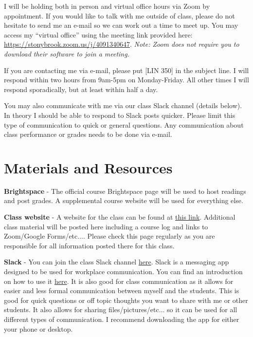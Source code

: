 \documentclass[11pt]{article}
\begin{document}
I will be holding both in person and virtual office hours via Zoom by appointment. 
If you would like to talk with me outside of class, please do not hesitate to send me an e-mail so we can work out a time to meet up. 
You may access my ``virtual office'' using the meeting link provided here: \href{https://stonybrook.zoom.us/j/4091340647}{https://stonybrook.zoom.us/j/4091340647}. 
\textit{Note: Zoom does not require you to download their software to join a meeting.}
\vspace{.25cm}

If you are contacting me via e-mail, please put [LIN 350] in the subject line. I will respond within two hours from 9am-5pm on Monday-Friday. All other times I will respond sporadically, but at least within half a day.  

You may also communicate with me via our class Slack channel (details below). In theory I should be able to respond to Slack posts quicker. Please limit this type of communication to quick or general questions. Any communication about class performance or grades needs to be done via e-mail.

\section*{Materials and Resources}

\textbf{Brightspace} - The official course Brightspace page will be used to host readings and post grades. A supplemental course website will be used for everything else.

\textbf{Class website} - A website for the class can be found at \href{https://www.scott-nelson.net/350SU23.html}{this link}. Additional class material will be posted here including a course log and links to Zoom/Google Forms/etc.... Please check this page regularly as you are responsible for all information posted there for this class.

\textbf{Slack} - You can join the class Slack channel \href{https://join.slack.com/t/lin350summer2023/shared_invite/zt-1wlogdm2b-JtDb~jPe89ky1jLfmbZeUg}{here}. Slack is a messaging app designed to be used for workplace communication. You can find an introduction on how to use it \href{https://slack.global.ssl.fastly.net/0cc2/pdfs/users_guide.pdf?fbclid=IwAR0IRj8DYxytM76m_j44wgg9-OWUmFMKfxLXfCM2Iv7qVyWP-5ZBo_T7Gsw}{here}. It is also good for class communication as it allows for easier and less formal communication between myself and the students. This is good for quick questions or off topic thoughts you want to share with me or other students. It also allows for sharing files/pictures/etc... so it can be used for all different types of communication. I recommend downloading the app for either your phone or desktop.
\end{document}
